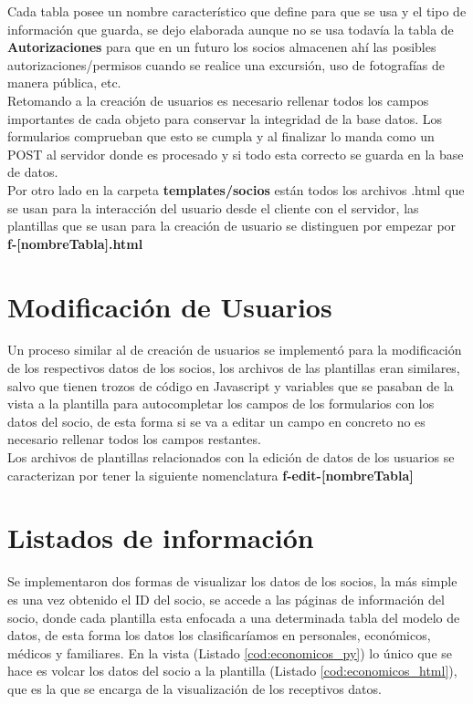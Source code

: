 Cada tabla posee un nombre característico que define para que se usa y el tipo de información que guarda, se dejo elaborada aunque no se usa todavía la tabla de \textbf{Autorizaciones} para que en un futuro los socios almacenen ahí las posibles autorizaciones/permisos
cuando se realice una excursión, uso de fotografías de manera pública, etc.\\

Retomando a la creación de usuarios es necesario rellenar todos los campos importantes de cada objeto para conservar la integridad de la base datos. Los formularios comprueban que esto se cumpla y al finalizar lo manda como un POST
al servidor donde es procesado y si todo esta correcto se guarda en la base de datos.\\

Por otro lado en la carpeta \textbf{templates/socios} están todos los archivos .html que se usan para la interacción del usuario desde el cliente con el servidor, las plantillas que se usan para la creación de usuario se distinguen por 
empezar por \textbf{f-[nombreTabla].html}


\section{Modificación de Usuarios}
\label{4:sec6}
Un proceso similar al de creación de usuarios se implementó para la modificación de los respectivos datos de los socios, los archivos de las plantillas eran similares, salvo que tienen trozos de código en Javascript
y variables que se pasaban de la vista a la plantilla para autocompletar los campos de los formularios con los datos del socio, de esta forma si se va a editar un campo en concreto no es necesario rellenar 
todos los campos restantes.\\

Los archivos de plantillas relacionados con la edición de datos de los usuarios se caracterizan por tener la siguiente nomenclatura \textbf{f-edit-[nombreTabla]}
\section{Listados de información}
\label{4:sec7}
Se implementaron dos formas de visualizar los datos de los socios, la más simple es una vez obtenido el ID del socio, se accede a las páginas de información del socio, donde cada plantilla esta enfocada a una determinada tabla
del modelo de datos, de esta forma los datos los clasificaríamos en personales, económicos, médicos y familiares. En la vista (Listado \ref{cod:economicos_py}) lo único que se hace es volcar los datos del socio a la plantilla 
(Listado \ref{cod:economicos_html}), que es la que se encarga de la visualización de los receptivos datos.

